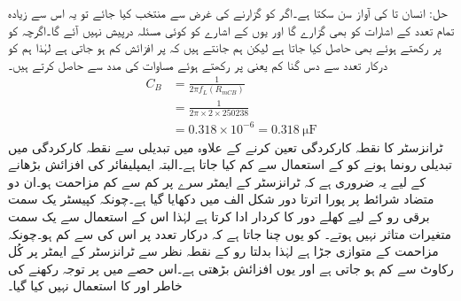 حل: انسان  تا  کی آواز سن سکتا ہے۔اگر  کو   گزارنے کی غرض سے منتخب کیا جائے تو یہ اس سے زیادہ تمام تعدد کے اشارات کو بھی گزارے گا اور یوں  کے اشارے کو کوئی مسئلہ درپیش نہیں آئے گا۔اگرچہ   کو   پر رکھتے ہوئے بھی  حاصل کیا جاتا ہے لیکن ہم جانتے ہیں کہ  پر افزائش کم ہو جاتی ہے لہٰذا ہم   کو درکار تعدد سے دس گنا کم یعنی   پر رکھتے ہوئے مساوات   کی مدد سے  حاصل کرتے ہیں۔
\begin{align*}
C_B&=\frac{1}{2 \pi f_L \left(R_{mCB} \right ) }\\
&=\frac{1}{2 \pi \times 2 \times 250238 }\\
&=0.318 \times 10^{-6}= \SI{0.318}{\micro \farad}
\end{align*}
ٹرانزسٹر کا نقطہ کارکردگی تعین کرنے کے علاوہ   میں تبدیلی سے  نقطہ کارکردگی میں تبدیلی رونما ہونے کو  کے استعمال سے کم کیا جاتا ہے۔البتہ ایمپلیفائر کی افزائش بڑھانے کے  لیے یہ ضروری ہے کہ ٹرانزسٹر کے ایمٹر سرے پر کم سے کم مزاحمت ہو۔ان دو متضاد شرائط پر پورا اترتا دور شکل  الف میں دکھایا گیا ہے۔چونکہ کپیسٹر  یک سمت برقی رو کے لیے کھلے دور کا کردار ادا کرتا ہے لہٰذا اس کے استعمال سے یک سمت متغیرات متاثر نہیں ہوتے۔ کو یوں چنا جاتا ہے کہ درکار تعدد پر اس کی   سے کم ہو۔چونکہ  مزاحمت  کے متوازی جڑا ہے لہٰذا بدلتا رو کے نقطہ نظر سے ٹرانزسٹر کے ایمٹر پر کُل رکاوٹ  سے کم ہو جاتی ہے اور یوں افزائش بڑھتی ہے۔اس حصے میں  پر توجہ رکھنے کی خاطر  اور  کا استعمال نہیں کیا گیا۔

